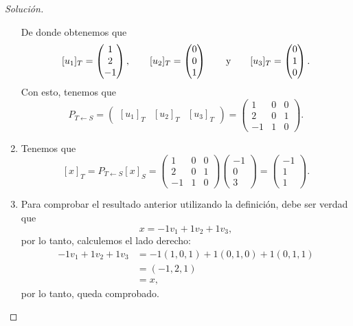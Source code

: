 \documentclass[a4,11pt]{aleph-notas}
\begin{document}
\begin{proof}[Solución]
\begin{enumerate}[leftmargin=*]
\[    \]
    De donde obtenemos que
    \[
        [u_1]_T
        = \begin{pmatrix}
            1\\2\\-1
        \end{pmatrix},
        \qquad
        [u_2]_T
        = \begin{pmatrix}
            0\\0\\1
        \end{pmatrix}
        \qquad\text{y}\qquad
        [u_3]_T
        = \begin{pmatrix}
            0\\1\\0
        \end{pmatrix}.
    \]
    Con esto, tenemos que
    \[
        P_{T\leftarrow S} = 
        \begin{pmatrix}
        [u_1]_T & [u_2]_T & [u_3]_T
        \end{pmatrix}
        =
        \begin{pmatrix}
             1 & 0 & 0\\
             2 & 0 & 1\\
            -1 & 1 & 0
        \end{pmatrix}.
    \]
\item
    Tenemos que
    \[
        [x]_T = P_{T\leftarrow S} [x]_S
        =
        \begin{pmatrix}
             1 & 0 & 0\\
             2 & 0 & 1\\
            -1 & 1 & 0
        \end{pmatrix}
        \begin{pmatrix} -1\\ 0 \\ 3 \end{pmatrix}
        =
        \begin{pmatrix} -1\\ 1 \\ 1 \end{pmatrix}.
    \]
\item
    Para comprobar el resultado anterior utilizando la definición, debe ser verdad que
    \[
        x = -1v_1 + 1v_2 + 1v_3,
    \]
    por lo tanto, calculemos el lado derecho:
    \begin{align*}
        -1v_1 + 1v_2 + 1v_3
        & = -1(1,0,1) + 1(0,1,0) + 1(0,1,1)\\
        & = (-1,2,1)\\
        & = x,
    \end{align*}
    por lo tanto, queda comprobado.\qedhere
\end{enumerate}
\end{proof}
\end{document}
